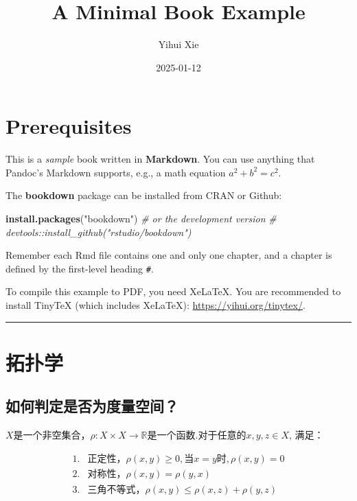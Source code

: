 \documentclass[
]{book}
\title{A Minimal Book Example}
\author{Yihui Xie}
\date{2025-01-12}
\newenvironment{Shaded}{\begin{snugshade}}{\end{snugshade}}
\newcommand{\CommentTok}[1]{\textcolor[rgb]{0.56,0.35,0.01}{\textit{#1}}}
\newcommand{\FunctionTok}[1]{\textcolor[rgb]{0.13,0.29,0.53}{\textbf{#1}}}
\newcommand{\NormalTok}[1]{#1}
\newcommand{\StringTok}[1]{\textcolor[rgb]{0.31,0.60,0.02}{#1}}
\begin{document}
\maketitle

{
\setcounter{tocdepth}{1}
\tableofcontents
}
\chapter{Prerequisites}\label{prerequisites}

This is a \emph{sample} book written in \textbf{Markdown}. You can use anything that Pandoc's Markdown supports, e.g., a math equation \(a^2 + b^2 = c^2\).

The \textbf{bookdown} package can be installed from CRAN or Github:

\begin{Shaded}
\begin{Highlighting}[]
\FunctionTok{install.packages}\NormalTok{(}\StringTok{"bookdown"}\NormalTok{)}
\CommentTok{\# or the development version}
\CommentTok{\# devtools::install\_github("rstudio/bookdown")}
\end{Highlighting}
\end{Shaded}

Remember each Rmd file contains one and only one chapter, and a chapter is defined by the first-level heading \texttt{\#}.

To compile this example to PDF, you need XeLaTeX. You are recommended to install TinyTeX (which includes XeLaTeX): \url{https://yihui.org/tinytex/}.

\begin{center}\rule{0.5\linewidth}{0.5pt}\end{center}

\chapter{拓扑学}\label{intro}

\section{如何判定是否为度量空间？}\label{ux5982ux4f55ux5224ux5b9aux662fux5426ux4e3aux5ea6ux91cfux7a7aux95f4}

\(X\)是一个非空集合，\(\rho: X\times X\rightarrow \mathbb{R}\)是一个函数.对于任意的\(x,y,z\in X\), 满足：

\[
\begin{aligned}
1. &\text{正定性，} \rho(x,y) \ge 0, \text{当} x = y \text{时}, \rho(x,y) = 0 \\
2. &\text{对称性，} \rho(x,y) = \rho(y,x) \\
3. &\text{三角不等式，} \rho(x,y) \le \rho(x,z) + \rho(y,z)
\end{aligned}
\]
\end{document}

